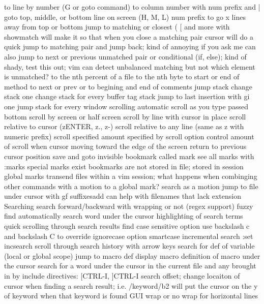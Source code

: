\documentclass[12pt]{book}
\begin{document}
      to line by number (G or goto command)
      to column number with num prefix and |
      goto top, middle, or bottom line on screen (H, M, L) num prefix to go x lines away from top or bottom
      jump to matching or closest ( { [ and more with %
        showmatch will make it so that when you close a matching pair cursor will do a quick jump to matching pair and jump back; kind of annoying if you ask me
        can also jump to next or previous unmatched pair or conditional (if, else); kind of shady, test this out; vim can detect unbalanced matching but not which element is unmatched?
      to the nth percent of a file
      to the nth byte
      to start or end of method
      to next or prev { or }
      to begining and end of comments
      jump stack
      change stack
        one change stack for every buffer
      tag stack
      jump to last insertion with gi
        one jump stack for every window
    scrolling
      automatic scroll as you type passed bottom
      scroll by screen or half screen
      scroll by line with cursor in place
      scroll relative to cursor (zENTER, z., z-)
      scroll relative to any line (same as z with numeric prefix)
      scroll specified amount specified by scroll option
      control amount of scroll when cursor moving toward the edge of the screen
    return to previous cursor position
    save and goto invisible bookmark called mark
      see all marks with :marks
      special marks exist
      bookmarks are not stored in file; stored in session
      global marks transend files within a vim session; what happens when combinging other commands with a motion to a global mark?
    search as a motion
    jump to file under cursor with gf
      suffixesadd can help with filenames that lack extension
Searching
  search forward/backward with wrapping or not (regex support)
  fuzzy find
  automatically search word under the cursor
  highlighting of search terms
  quick scrolling through search results
  find
  case sensitive option
    use backslash c and backslash C to override ignorecase option
    smartcase
  incremental search :set incsearch
  scroll through search history with arrow keys
  search for def of variable (local or global scope)
  jump to macro def
  display macro definition of macro under the cursor
  search for a word under the cursor in the current file and any brought in by include directives: [CTRL-I, ]CTRL-I
  search offset; change locaiton of cursor when finding a search result; i.e. /keyword/b2 will put the cursor on the y of keyword when that keyword is found
GUI
  wrap or no wrap for horizontal lines
}
\end{document}
